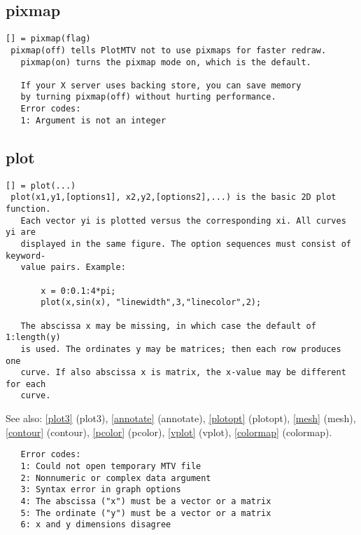 \documentclass[a4paper]{article}
\begin{document}
\subsection{pixmap\label{pixmap}}

\begin{tscreen}
\begin{verbatim}
[] = pixmap(flag)
 pixmap(off) tells PlotMTV not to use pixmaps for faster redraw.
   pixmap(on) turns the pixmap mode on, which is the default.
   
   If your X server uses backing store, you can save memory
   by turning pixmap(off) without hurting performance.
   Error codes:
   1: Argument is not an integer 
\end{verbatim}
\end{tscreen}





\subsection{plot\label{plot}}

\begin{tscreen}
\begin{verbatim}
[] = plot(...)
 plot(x1,y1,[options1], x2,y2,[options2],...) is the basic 2D plot function.
   Each vector yi is plotted versus the corresponding xi. All curves yi are
   displayed in the same figure. The option sequences must consist of keyword-
   value pairs. Example:

       x = 0:0.1:4*pi;
       plot(x,sin(x), "linewidth",3,"linecolor",2);

   The abscissa x may be missing, in which case the default of 1:length(y)
   is used. The ordinates y may be matrices; then each row produces one
   curve. If also abscissa x is matrix, the x-value may be different for each
   curve.
\end{verbatim}

See also: \ref{plot3} {(plot3)}, \ref{annotate} {(annotate)}, \ref{plotopt} {(plotopt)}, \ref{mesh} {(mesh)}, \ref{contour} {(contour)}, \ref{pcolor} {(pcolor)}, \ref{vplot} {(vplot)}, \ref{colormap} {(colormap)}.
\begin{verbatim}
   Error codes:
   1: Could not open temporary MTV file
   2: Nonnumeric or complex data argument
   3: Syntax error in graph options
   4: The abscissa ("x") must be a vector or a matrix
   5: The ordinate ("y") must be a vector or a matrix
   6: x and y dimensions disagree
   
\end{verbatim}
\end{tscreen}
\end{document}
